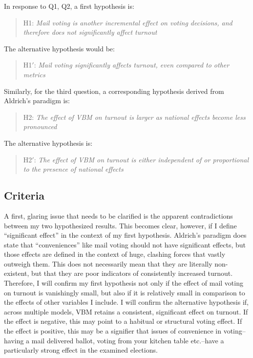 \documentclass[12pt,twoside]{reedthesis}
\begin{document}
  In response to Q1, Q2, a first hypothesis is:
  
  \begin{quotation}  
  H1: \textit{Mail voting is another incremental effect on voting decisions, and therefore
  does not significantly affect turnout}
  \end{quotation}
  
  The alternative hypothesis would be:
  
  \begin{quotation}  
  H1$'$: \textit{Mail  voting  significantly  affects  turnout,  even  compared  to  other  metrics}
  \end{quotation}
  
  Similarly, for the third question, a corresponding hypothesis derived
  from Aldrich's paradigm is:
  
  \begin{quotation}  
  H2: \textit{The  effect  of  VBM  on  turnout  is  larger  as  national  effects  become less pronounced}
  \end{quotation}
  
  The alternative hypothesis is:
  
  \begin{quotation}  
  H2$'$: \textit{The  effect  of  VBM  on  turnout  is either independent of or proportional to the presence of national effects}
  \end{quotation}
  
  \subsection{Criteria}\label{criteria}
  
  A first, glaring issue that needs to be clarified is the apparent
  contradictions between my two hypothesized results. This becomes clear,
  however, if I define ``significant effect'' in the context of my first
  hypothesis. Aldrich's paradigm does state that ``conveniences'' like
  mail voting should not have significant effects, but those effects are
  defined in the context of huge, clashing forces that vastly outweigh
  them. This does not necessarily mean that they are literally
  non-existent, but that they are poor indicators of consistently
  increased turnout. Therefore, I will confirm my first hypothesis not
  only if the effect of mail voting on turnout is vanishingly small, but
  also if it is relatively small in comparison to the effects of other
  variables I include. I will confirm the alternative hypothesis if,
  across multiple models, VBM retains a consistent, significant effect on
  turnout. If the effect is negative, this may point to a habitual or
  structural voting effect. If the effect is positive, this may be a
  signifier that issues of convenience in voting--having a mail delivered
  ballot, voting from your kitchen table etc.--have a particularly strong
  effect in the examined elections.
  
\end{document}
